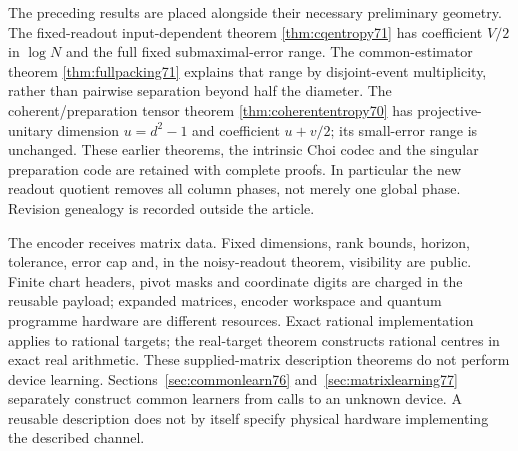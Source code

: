 The preceding results are placed alongside their necessary preliminary
geometry. The fixed-readout input-dependent theorem
\ref{thm:cqentropy71} has coefficient $V/2$ in $\log N$ and the full
fixed submaximal-error range. The common-estimator theorem
\ref{thm:fullpacking71} explains that range by disjoint-event
multiplicity, rather than pairwise separation beyond half the diameter.
The coherent/preparation tensor theorem
\ref{thm:coherententropy70} has projective-unitary dimension $u=d^2-1$
and coefficient $u+v/2$; its small-error range is unchanged.
These earlier theorems, the intrinsic Choi codec and the singular
preparation code are retained with complete proofs. In particular the
new readout quotient removes all column phases, not merely one global
phase. Revision genealogy is recorded outside the article.

The encoder receives matrix data. Fixed dimensions, rank bounds,
horizon, tolerance, error cap and, in the noisy-readout theorem,
visibility are public. Finite chart headers,
pivot masks and coordinate digits are charged in the reusable payload;
expanded matrices, encoder workspace and quantum programme hardware
are different resources. Exact rational implementation applies to
rational targets; the real-target theorem constructs rational centres
in exact real arithmetic. These supplied-matrix description theorems
do not perform device learning. Sections~\ref{sec:commonlearn76}
and~\ref{sec:matrixlearning77} separately construct common learners
from calls to an unknown device. A reusable description does not by
itself specify physical hardware implementing the described channel.

